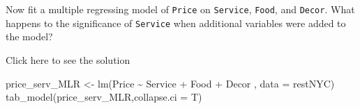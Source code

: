 \documentclass[
  letterpaper,
  DIV=11,
  numbers=noendperiod]{scrartcl}
\newenvironment{Shaded}{\begin{snugshade}}{\end{snugshade}}
\newcommand{\AttributeTok}[1]{\textcolor[rgb]{0.40,0.45,0.13}{#1}}
\newcommand{\FunctionTok}[1]{\textcolor[rgb]{0.28,0.35,0.67}{#1}}
\newcommand{\NormalTok}[1]{\textcolor[rgb]{0.00,0.23,0.31}{#1}}
\newcommand{\OtherTok}[1]{\textcolor[rgb]{0.00,0.23,0.31}{#1}}
\newcommand{\SpecialCharTok}[1]{\textcolor[rgb]{0.37,0.37,0.37}{#1}}
\begin{document}
\begin{tcolorbox}[enhanced jigsaw, titlerule=0mm, colbacktitle=quarto-callout-warning-color!10!white, opacityback=0, left=2mm, rightrule=.15mm, toptitle=1mm, opacitybacktitle=0.6, colback=white, coltitle=black, breakable, bottomrule=.15mm, arc=.35mm, bottomtitle=1mm, title={Task 8}, toprule=.15mm, leftrule=.75mm, colframe=quarto-callout-warning-color-frame]

Now fit a multiple regressing model of \texttt{Price} on
\texttt{Service}, \texttt{Food}, and \texttt{Decor}. What happens to the
significance of \texttt{Service} when additional variables were added to
the model?

Click here to see the solution

\begin{Shaded}
\begin{Highlighting}[]
\NormalTok{price\_serv\_MLR }\OtherTok{\textless{}{-}} \FunctionTok{lm}\NormalTok{(Price  }\SpecialCharTok{\textasciitilde{}}\NormalTok{ Service }\SpecialCharTok{+}\NormalTok{ Food }\SpecialCharTok{+}\NormalTok{ Decor , }\AttributeTok{data =}\NormalTok{ restNYC)}
\FunctionTok{tab\_model}\NormalTok{(price\_serv\_MLR,}\AttributeTok{collapse.ci =}\NormalTok{ T)}
\end{Highlighting}
\end{Shaded}


\end{tcolorbox}
\end{document}
